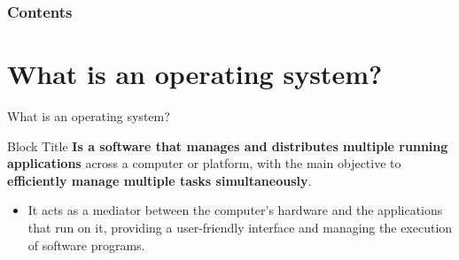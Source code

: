 \documentclass[10pt]{beamer}
\title[Universidad Panamericana]{}
\subtitle{Introduction to Real-Time Operating Systems}
\author[]{Name}
\institute[ltonix@up.edu.mx]{Universidad Panamericana}
\date[Presentation \today]
{Presentation \today}
\begin{document}
\frame{\titlepage}
\begin{frame}
\frametitle{Contents}
\tableofcontents
\end{frame}
\section{What is an operating system?}
    \begin{frame}{What is an operating system?}
      
      \begin{block}{Block Title}
        \textbf{Is a software that manages and distributes multiple running applications} across a computer or platform, with the main objective to \textbf{efficiently manage multiple tasks simultaneously}.
      \end{block}
      \begin{itemize}
        \item It acts as a mediator between the computer's hardware and the applications that run on it, providing a user-friendly interface and managing the execution of software programs.
      \end{itemize}
    \end{frame}
\end{document}
